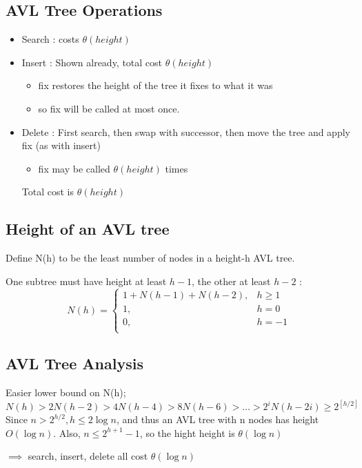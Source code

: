 \documentclass{article}
\begin{document}
\subsection{AVL Tree Operations}
\begin{itemize}
\item Search : costs \(\theta(height)\)
\item Insert : Shown already, total cost \(\theta(height)\) 
\begin{itemize}
\item fix restores the height of the tree  it fixes to what it was
\item so fix will be called at most once.
\end{itemize}
\item Delete : First search, then swap with successor, then move the tree and apply fix (as with insert)
\begin{itemize}
\item fix may be called \(\theta(height)\) times 
\end{itemize}
Total cost is \(\theta(height)\)
\end{itemize}

\subsection{Height of an AVL tree}
Define N(h) to be the least number of nodes in a height-h AVL tree.

One subtree must have height at least \(h -1\), the other at least \(h -2\) : 
$$N(h) = \begin{cases}
1 + N(h -1) + N(h-2),  & h \geq 1\\
1, & h = 0\\
0, & h = -1 \\
\end{cases}$$

\subsection{AVL Tree Analysis}
Easier lower bound on N(h);
$$N(h) > 2N(h-2) > 4N(h-4) > 8N(h-6) > \ldots > 2^i N(h-2i) \geq 2^{[h/2]}$$
Since \(n > 2^{h/2}, h \leq 2 \log n\), 
and thus an AVL tree with n nodes has height \(O(\log n)\). 
Also, \(n \leq 2^{h+1} - 1\), so the hight height is \(\theta(\log n)\)

\(\implies\) search, insert, delete all cost \(\theta(\log n)\)
\end{document}
